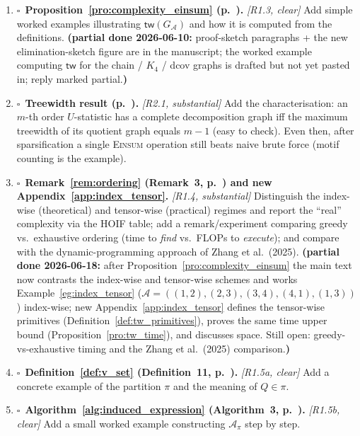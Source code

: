 \documentclass[11pt]{article}
\newcommand{\bx}{$\square$\ }   %
\newcommand{\at}[1]{\textbf{#1}} %
\begin{document}
\begin{enumerate}[label=\arabic*., leftmargin=*, itemsep=0.45em]
\item \bx \at{Proposition~\ref{pro:complexity_einsum} (p.~\pageref{pro:complexity_einsum}).}
\emph{[R1.3, clear]} Add simple worked examples illustrating $\mathsf{tw}(G_{\mathcal{A}})$
and how it is computed from the definitions.
\textbf{(partial done 2026-06-10:} proof-sketch paragraphs + the new
elimination-sketch figure are in the manuscript; the worked example computing
$\mathsf{tw}$ for the chain / $K_4$ / dcov graphs is drafted but not yet
pasted in; reply marked partial.\textbf{)}

\item \bx \at{Treewidth result (p.~\pageref{pro:complexity_einsum}).}
\emph{[R2.1, substantial]} Add the characterisation: an $m$-th order $U$-statistic has
a complete decomposition graph iff the maximum treewidth of its quotient graph equals
$m-1$ (easy to check). Even then, after sparsification a single \textsc{Einsum}
operation still beats naive brute force (motif counting is the example).

\item \bx \at{Remark~\ref{rem:ordering} (Remark~3, p.~\pageref{rem:ordering}) and new Appendix~\ref{app:index_tensor}.}
\emph{[R1.4, substantial]} Distinguish the index-wise (theoretical) and tensor-wise
(practical) regimes and report the ``real'' complexity via the HOIF table; add a
remark/experiment comparing greedy vs.\ exhaustive ordering (time to \emph{find} vs.\
FLOPs to \emph{execute}); and compare with the dynamic-programming approach of Zhang
et al.\ (2025).
\textbf{(partial done 2026-06-18:} after Proposition~\ref{pro:complexity_einsum} the
main text now contrasts the index-wise and tensor-wise schemes and works
Example~\ref{eg:index_tensor} ($\mathcal{A}=((1,2),(2,3),(3,4),(4,1),(1,3))$) index-wise;
new Appendix~\ref{app:index_tensor} defines the tensor-wise primitives
(Definition~\ref{def:tw_primitives}), proves the same time upper bound
(Proposition~\ref{pro:tw_time}), and discusses space. Still open: greedy-vs-exhaustive
timing and the Zhang et al.\ (2025) comparison.\textbf{)}

\item \bx \at{Definition~\ref{def:v_set} (Definition~11, p.~\pageref{def:v_set}).}
\emph{[R1.5a, clear]} Add a concrete example of the partition $\pi$ and the meaning of
$Q\in\pi$.

\item \bx \at{Algorithm~\ref{alg:induced_expression} (Algorithm~3, p.~\pageref{alg:induced_expression}).}
\emph{[R1.5b, clear]} Add a small worked example constructing $\mathcal{A}_\pi$ step by
step.


\end{enumerate}
\end{document}
